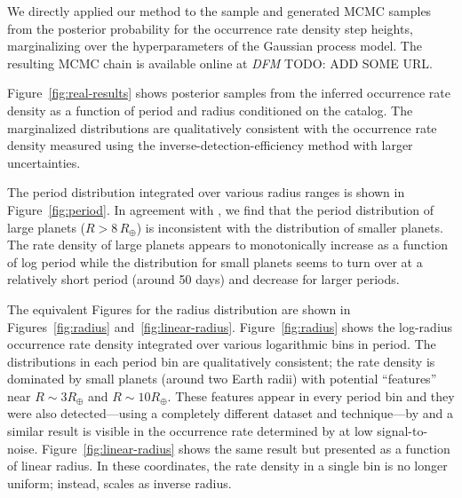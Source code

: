 \documentclass[12pt,preprint]{aastex}
\newcommand{\figref}[1]{\ref{fig:#1}}
\newcommand{\Fig}[1]{Figure~\figref{#1}}
\newcommand{\fig}[1]{\Fig{#1}}
\newcommand{\todo}[3]{{\color{#2} \emph{#1} TODO: #3}}
\newcommand{\dfmtodo}[1]{\todo{DFM}{red}{#1}}
\newcommand{\radius}{\ensuremath{R}}
\begin{document}
We directly applied our method to the \citet{petigura} sample and generated
MCMC samples from the posterior probability for the occurrence rate density
step heights, marginalizing over the hyperparameters of the Gaussian process
model.
The resulting MCMC chain is available online at \dfmtodo{ADD SOME URL}.

\Fig{real-results} shows posterior samples from the inferred occurrence rate
density as a function of period and radius conditioned on the catalog.
The marginalized distributions are qualitatively consistent with the
occurrence rate density measured using the inverse-detection-efficiency
method with larger uncertainties.

The period distribution integrated over various radius ranges is shown in
\fig{period}.
In agreement with \citet{dong}, we find that the period distribution of large
planets ($R > 8\,R_\oplus$) is inconsistent with the distribution of smaller
planets.
The rate density of large planets appears to monotonically increase as a
function of log period while the distribution for small planets seems to turn
over at a relatively short period (around 50 days) and decrease for larger
periods.

The equivalent Figures for the radius distribution are shown in
Figures~\figref{radius} and~\figref{linear-radius}.
\Fig{radius} shows the log-radius occurrence rate density integrated over
various logarithmic bins in period.
The distributions in each period bin are qualitatively consistent; the
rate density is dominated by small planets (around two Earth radii) with
potential ``features'' near $\radius\sim3\radius_\oplus$ and $\radius\sim
10\radius_\oplus$.
These features appear in every period bin and they were also detected---using
a completely different dataset and technique---by \citet{dong} and a similar
result is visible in the occurrence rate determined by \citet[][their Figure
7]{fressin-fp} at low signal-to-noise.
\Fig{linear-radius} shows the same result but presented as a function of
linear radius.
In these coordinates, the rate density in a single bin is no longer
uniform; instead, scales as inverse radius.
\end{document}
